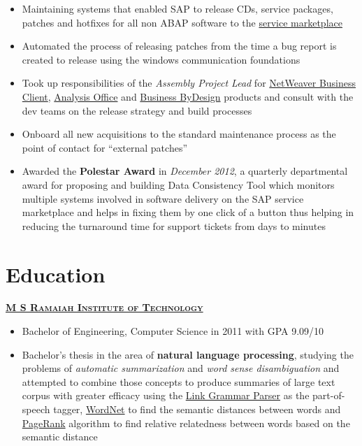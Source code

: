 \documentclass{article}
\begin{document}
\begin{itemize}[noitemsep,nolistsep]
\item Maintaining systems that enabled SAP to release CDs, service packages, patches and hotfixes for all non ABAP software to the \href{https://support.sap.com/en/index.html}{service marketplace}
\item Automated the process of releasing patches from the time a bug report is created to release using the windows communication foundations
\item Took up responsibilities of the \textit{Assembly Project Lead} for \href{https://help.sap.com/docs/SAP_NETWEAVER_731_BW_ABAP/9737050ef01843f19572591b42128f1b/4c5b13bf97817513e10000000a42189b.html?version=7.31.23}{NetWeaver Business Client}, \href{https://help.sap.com/docs/SAP_BUSINESSOBJECTS_ANALYSIS_OFFICE?version=2.8.0.0}{Analysis Office} and \href{https://www.sap.com/products/business-bydesign.html}{Business ByDesign} products and consult with the dev teams on the release strategy and build processes
\item Onboard all new acquisitions to the standard maintenance process as the point of contact for “external patches”
\item Awarded the \textbf{Polestar Award} in \textit{December 2012}, a quarterly departmental award for proposing and building Data Consistency Tool which monitors multiple systems involved in software delivery on the SAP service marketplace and helps in fixing them by one click of a button thus helping in reducing the turnaround time for support tickets from days to minutes
\end{itemize}

\section{Education}
{\raggedright{\textsc{\textbf{\href{http://www.msrit.edu}{M S Ramaiah Institute of Technology}}}}} \hfill {}

\begin{itemize}[noitemsep,nolistsep]
\item Bachelor of Engineering, Computer Science in 2011 with GPA 9.09/10
\item Bachelor’s thesis in the area of \textbf{natural language processing}, studying the problems of \textit{automatic summarization} and \textit{word sense disambiguation} and attempted to combine those concepts to produce summaries of large text corpus with greater efficacy using the \href{https://www.link.cs.cmu.edu/link/}{Link Grammar Parser} as the part-of-speech tagger, \href{https://wordnet.princeton.edu/}{WordNet} to find the semantic distances between words and \href{https://en.wikipedia.org/wiki/PageRank}{PageRank} algorithm to find relative relatedness between words based on the semantic distance
\end{itemize}
\end{document}
